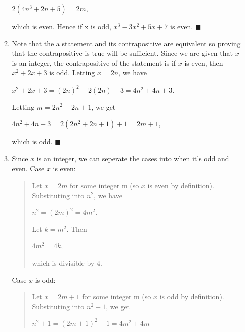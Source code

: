 \documentclass[12pt]{article}
\begin{document}
\begin{enumerate}
\begin{enumerate}
                    \begin{center}
                        $2(4n^3+2n+5) = 2m$,
                    \end{center}
                    which is even. Hence if x is odd, $x^3-3x^2+5x+7$ is even. \hfill $\blacksquare$
              \item Note that the a statement and its contrapositive are equivalent so proving that
                    the contrapositive is true will be sufficient. Since we are given that $x$ is
                    an integer, the contrapositive of the statement is if $x$ is even, then
                    $x^2+2x+3$ is odd. Letting $x = 2n$, we have
                    \begin{center}
                        $x^2+2x+3 = (2n)^2+2(2n) + 3 = 4n^2 + 4n + 3$.
                    \end{center}
                    Letting $m = 2n^2+2n+1$, we get
                    \begin{center}
                        $4n^2 + 4n + 3 = 2(2n^2+2n+1) + 1 = 2m + 1$,
                    \end{center}
                    which is odd. \hfill $\blacksquare$
              \item Since $x$ is an integer, we can seperate the cases into when it's odd and even.
                    \newline Case $x$ is even:
                    \begin{quote}
                        Let $x = 2m$ for some integer m (so $x$ is even by definition).
                        Substituting into $n^2$, we have
                        \begin{center}
                            $n^2 = (2m)^2 = 4m^2$.
                        \end{center}
                        Let $k = m^2$. Then
                        \begin{center}
                            $4m^2 = 4k$,
                        \end{center}
                        which is divisible by $4$.
                    \end{quote}
                    Case $x$ is odd:
                    \begin{quote}
                        Let $x = 2m + 1$ for some integer m (so $x$ is odd by definition).
                        Substituting into $n^2+1$, we get
                        \begin{center}
                            $n^2+1 = (2m+1)^2-1 = 4m^2 + 4m$

\end{center}
\end{quote}
\end{enumerate}
\end{enumerate}
\end{document}

